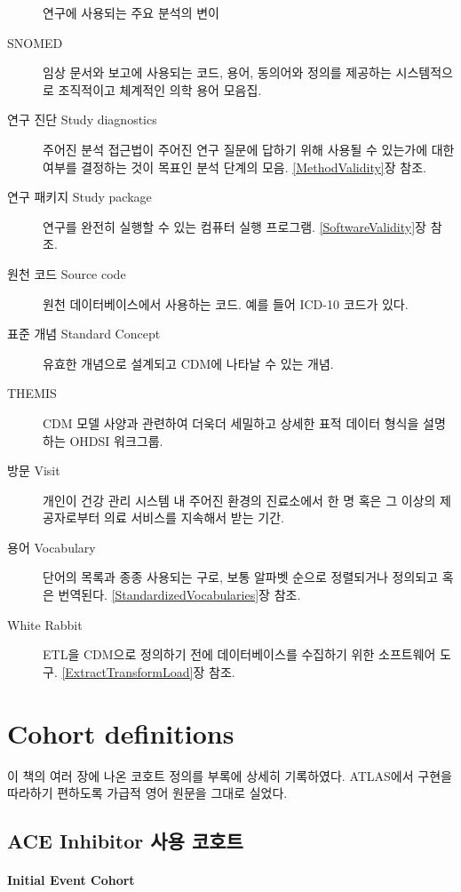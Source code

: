 \documentclass[10.5pt]{book}
\theoremstyle{definition}
\theoremstyle{definition}
\theoremstyle{definition}
\theoremstyle{remark}
\begin{document}
\begin{description}
연구에 사용되는 주요 분석의 변이
\item[SNOMED]
임상 문서와 보고에 사용되는 코드, 용어, 동의어와 정의를 제공하는
시스템적으로 조직적이고 체계적인 의학 용어 모음집.
\item[연구 진단 Study diagnostics]
주어진 분석 접근법이 주어진 연구 질문에 답하기 위해 사용될 수 있는가에
대한 여부를 결정하는 것이 목표인 분석 단계의 모음.
\ref{MethodValidity}장 참조.
\item[연구 패키지 Study package]
연구를 완전히 실행할 수 있는 컴퓨터 실행 프로그램.
\ref{SoftwareValidity}장 참조.
\item[원천 코드 Source code]
원천 데이터베이스에서 사용하는 코드. 예를 들어 ICD-10 코드가 있다.
\item[표준 개념 Standard Concept]
유효한 개념으로 설계되고 CDM에 나타날 수 있는 개념.
\item[THEMIS]
CDM 모델 사양과 관련하여 더욱더 세밀하고 상세한 표적 데이터 형식을
설명하는 OHDSI 워크그룹.
\item[방문 Visit]
개인이 건강 관리 시스템 내 주어진 환경의 진료소에서 한 명 혹은 그 이상의
제공자로부터 의료 서비스를 지속해서 받는 기간.
\item[용어 Vocabulary]
단어의 목록과 종종 사용되는 구로, 보통 알파벳 순으로 정렬되거나 정의되고
혹은 번역된다. \ref{StandardizedVocabularies}장 참조.
\item[White Rabbit]
ETL을 CDM으로 정의하기 전에 데이터베이스를 수집하기 위한 소프트웨어
도구. \ref{ExtractTransformLoad}장 참조.
\end{description}

\chapter{Cohort definitions}\label{CohortDefinitions}

이 책의 여러 장에 나온 코호트 정의를 부록에 상세히 기록하였다. ATLAS에서
구현을 따라하기 편하도록 가급적 영어 원문을 그대로 실었다.

\section{ACE Inhibitor 사용 코호트}\label{AceInhibitors}

\subsubsection*{Initial Event Cohort}\label{initial-event-cohort}
\end{document}
